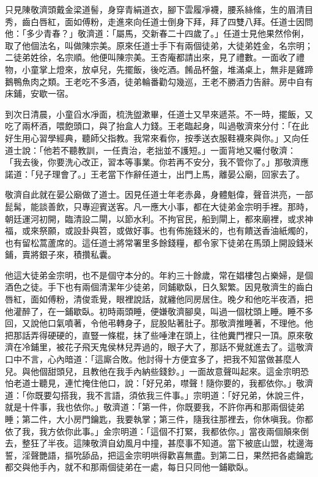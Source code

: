 只見陳敬濟頭戴金梁道髻，身穿青絹道衣，腳下雲履凈襪，腰系絲絛，生的眉清目秀，齒白唇紅，面如傅粉，走進來向任道士倒身下拜，拜了四雙八拜。任道士因問他：「多少青春？」敬濟道：「屬馬，交新春二十四歲了。」任道士見他果然伶俐，取了他個法名，叫做陳宗美。原來任道士手下有兩個徒弟，大徒弟姓金，名宗明；二徒弟姓徐，名宗順。他便叫陳宗美。王杏庵都請出來，見了禮數。一面收了禮物，小童掌上燈來，放卓兒，先擺飯，後吃酒。餚品杯盤，堆滿桌上，無非是雞蹄鵝鴨魚肉之類。王老吃不多酒，徒弟輪番勸勾幾巡，王老不勝酒力告辭。房中自有床鋪，安歇一宿。

到次日清晨，小童舀水凈面，梳洗盥漱畢，任道士又早來遞茶。不一時，擺飯，又吃了兩杯酒，喂飽頭口，與了抬盒人力錢。王老臨起身，叫過敬濟來分付：「在此好生用心習學經典，聽師父指教。我常來看你，按季送衣服鞋襪來與你。」又向任道士說：「他若不聽教訓，一任責治，老拙並不護短。」一面背地又囑付敬濟： 「我去後，你要洗心改正，習本等事業。你若再不安分，我不管你了。」那敬濟應諾道：「兒子理會了。」王老當下作辭任道士，出門上馬，離晏公廟，回家去了。

敬濟自此就在晏公廟做了道士。因見任道士年老赤鼻，身體魁偉，聲音洪亮，一部髭髯，能談善飲，只專迎賓送客。凡一應大小事，都在大徒弟金宗明手裡。那時，朝廷運河初開，臨清設二閘，以節水利。不拘官民，船到閘上，都來廟裡，或求神福，或來祭願，或設卦與笤，或做好事。也有佈施錢米的，也有饋送香油紙燭的，也有留松蒿蘆席的。這任道士將常署里多餘錢糧，都令家下徒弟在馬頭上開設錢米鋪，賣將銀子來，積攢私囊。

他這大徒弟金宗明，也不是個守本分的。年約三十餘歲，常在娼樓包占樂婦，是個酒色之徒。手下也有兩個清潔年少徒弟，同鋪歇臥，日久絮繁。因見敬濟生的齒白唇紅，面如傅粉，清俊乖覺，眼裡說話，就纏他同房居住。晚夕和他吃半夜酒，把他灌醉了，在一鋪歇臥。初時兩頭睡，便嫌敬濟腳臭，叫過一個枕頭上睡。睡不多回，又說他口氣噴著，令他弔轉身子，屁股貼著肚子。那敬濟推睡著，不理他。他把那話弄得硬硬的，直豎一條棍，抹了些唾津在頭上，往他糞門裡只一頂。原來敬濟在冷鋪里，被花子飛天鬼侯林兒弄過的，眼子大了，那話不覺就進去了。這敬濟口中不言，心內暗道：「這廝合敗。他討得十方便宜多了，把我不知當做甚麼人兒。與他個甜頭兒，且教他在我手內納些錢鈔。」一面故意聲叫起來。這金宗明恐怕老道士聽見，連忙掩住他口，說：「好兄弟，噤聲！隨你要的，我都依你。」敬濟道：「你既要勾搭我，我不言語，須依我三件事。」宗明道：「好兄弟，休說三件，就是十件事，我也依你。」敬濟道：「第一件，你既要我，不許你再和那兩個徒弟睡；第二件，大小房門鑰匙，我要執掌；第三件，隨我往那裡去，你休嗔我。你都依了我，我方依你此事。」金宗明道：「這個不打緊，我都依你。」當夜兩個顛來倒去，整狂了半夜。這陳敬濟自幼風月中撞，甚麼事不知道。當下被底山盟，枕邊海誓，淫聲艷語，摳吮舔品，把這金宗明哄得歡喜無盡。到第二日，果然把各處鑰匙都交與他手內，就不和那兩個徒弟在一處，每日只同他一鋪歇臥。

